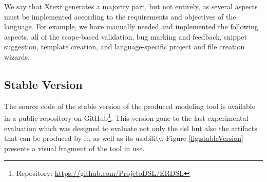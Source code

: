 We say that Xtext generates a majority part, but not entirely, as several aspects must be implemented according to the requirements and objectives of the language.
For example, we have manually needed and implemented the following aspects, all of the scope-based validation, bug marking and feedback, snippet suggestion, template creation, and language-specific project and file creation wizards.

\subsection{Stable Version}

The source code of the stable version of the produced modeling tool is available in a public repository on GitHub\footnote{Repository: \url{https://github.com/ProjetoDSL/ERDSL}}.
This version gone to the last experimental evaluation which was designed to evaluate not only the \ac{dsl} but also the artifacts that can be produced by it, as well as its usability.
Figure \ref{fig:stableVersion} presents a visual fragment of the tool in use.

